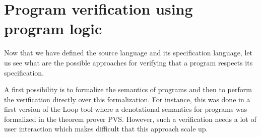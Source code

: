 
\section{Program verification using program logic}\label{javaVerif:verifStyles}

Now that we have defined the source language and its specification language, let us see 
what are the possible approaches for verifying that  a program respects its specification.

 A first possibility is to formalize the semantics of programs and then to perform the verification directly over this formalization.
For instance, this was done in a first version of the Loop tool \cite{jacobs03java} where a denotational semantics for programs was formalized in the theorem prover PVS.
 However, such a  verification needs a lot of user interaction which makes  difficult that this approach scale up.
 
